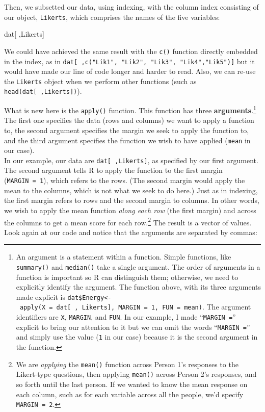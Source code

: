 \documentclass[]{tufte-handout}
\newenvironment{Shaded}{}{}
\newcommand{\NormalTok}[1]{#1}
\begin{document}
Then, we subsetted our data, using indexing, with the column index
consisting of our object, \texttt{Likerts}, which comprises the names of
the five variables:

\begin{Shaded}
\begin{Highlighting}[]
\NormalTok{dat[ ,Likerts]}
\end{Highlighting}
\end{Shaded}

We could have achieved the same result with the \texttt{c()} function
directly embedded in the index, as in
\texttt{dat{[}\ ,c("Lik1",\ "Lik2",\ "Lik3",\ "Lik4","Lik5"){]}} but it
would have made our line of code longer and harder to read. Also, we can
re-use the \texttt{Likerts} object when we perform other functions (such
as \texttt{head(dat{[}\ ,Likerts{]})}).

What is new here is the \texttt{apply()} function. This function has
three \textbf{arguments}.\footnote{An argument is a statement within a
  function. Simple functions, like \texttt{summary()} and
  \texttt{median()} take a single argument. The order of arguments in a
  function is important so R can distinguish them; otherwise, we need to
  explicitly identify the argument. The function above, with its three
  arguments made explicit is
  \texttt{dat\$Energy\textless{}-\ apply(X\ =\ dat{[}\ ,\ Likerts{]},\ MARGIN\ =\ 1,\ FUN\ =\ mean)}.
  The argument identifiers are \texttt{X}, \texttt{MARGIN}, and
  \texttt{FUN}. In our example, I made ``\texttt{MARGIN\ =}'' explicit
  to bring our attention to it but we can omit the words
  ``\texttt{MARGIN\ =}'' and simply use the value (\texttt{1} in our
  case) because it is the second argument in the function.} The first
one specifies the data (rows and columns) we want to apply a function
to, the second argument specifies the margin we seek to apply the
function to, and the third argument specifies the function we wish to
have applied (\texttt{mean} in our case).\\
In our example, our data are \texttt{dat{[}\ ,Likerts{]}}, as specified
by our first argument.\\
The second argument tells R to apply the function to the first margin
(\texttt{MARGIN\ =\ 1}), which refers to the rows. (The second margin
would apply the mean to the columns, which is not what we seek to do
here.) Just as in indexing, the first margin refers to rows and the
second margin to columns. In other words, we wish to apply the mean
function \emph{along each row} (the first margin) and across the columns
to get a mean score for each row.\footnote{We are \emph{applying} the
  \texttt{mean()} function across Person 1's responses to the
  Likert-type questions, then applying \texttt{mean()} across Person 2's
  responses, and so forth until the last person. If we wanted to know
  the mean response on each column, such as for each variable across all
  the people, we'd specify \texttt{MARGIN\ =\ 2}.} The result is a
vector of values.\\
Look again at our code and notice that the arguments are separated by
commas:
\end{document}
